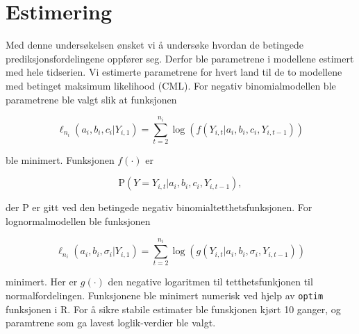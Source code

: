 \section{Estimering}

Med denne undersøkelsen ønsket vi å undersøke hvordan de betingede
prediksjonsfordelingene oppfører seg. Derfor ble parametrene i modellene
estimert med hele tidserien. Vi estimerte parametrene for hvert land til de to
modellene med betinget maksimum likelihood (CML). For negativ binomialmodellen
ble parametrene ble valgt slik at funksjonen

$$
\ell_{n_i}(a_i, b_i , c_i| Y_{i, 1}) = \sum_{t=2}^{n_i} \log(f(Y_{i,t}|a_i, b_i, c_i, Y_{i, t-1}))
$$

\noindent
ble minimert. Funksjonen $f(\cdot)$ er 

$$
\mathrm{P}(Y=Y_{i,t}|a_i, b_i, c_i, Y_{i, t-1}),
$$

\noindent
der $\mathrm{P}$ er gitt ved den betingede negativ binomialtetthetsfunksjonen.
For lognormalmodellen ble funksjonen

$$
\ell_{n_i}(a_i, b_i , \sigma_i| Y_{i, 1}) = \sum_{t=2}^{n_i} \log(g(Y_{i,t}|a_i, b_i, \sigma_i, Y_{i, t-1}))
$$

\noindent
minimert. Her er $g(\cdot)$ den negative logaritmen til tetthetsfunkjonen til
normalfordelingen. Funksjonene ble minimert numerisk ved hjelp av
\texttt{optim} funksjonen i R. For å sikre stabile estimater ble funskjonen
kjørt 10 ganger, og paramtrene som ga lavest loglik-verdier ble valgt.
